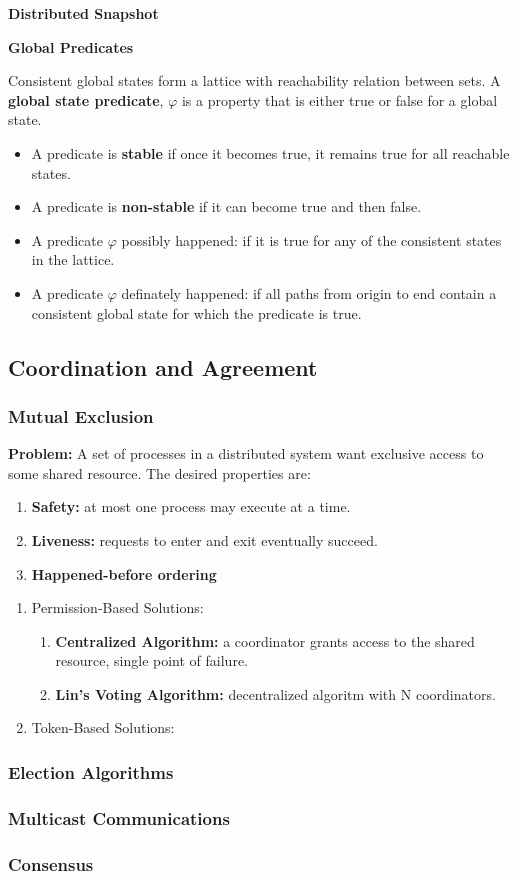 \textbf{Distributed Snapshot}

\textbf{Global Predicates}

Consistent global states form a lattice with reachability relation between sets.
A \textbf{global state predicate}, $\varphi$ is a property that is either true or false for a global state.
\begin{itemize}
    \item A predicate is \textbf{stable} if once it becomes true, it remains true for all reachable states.
    \item A predicate is \textbf{non-stable} if it can become true and then false.
    \item A predicate $\varphi$ possibly happened: if it is true for any of the consistent states in the lattice.
    \item A predicate $\varphi$ definately happened: if all paths from origin to end contain a consistent global state for which the predicate is true.
\end{itemize}

\subsection{Coordination and Agreement}

\subsubsection*{Mutual Exclusion}

\textbf{Problem:} A set of processes in a distributed system want exclusive access to some shared resource.
The desired properties are:
\begin{enumerate}
    \item \textbf{Safety:} at most one process may execute at a time.
    \item \textbf{Liveness:} requests to enter and exit eventually succeed.
    \item \textbf{Happened-before ordering}
\end{enumerate}

\begin{enumerate}
    \item Permission-Based Solutions:
    \begin{enumerate}
        \item \textbf{Centralized Algorithm:} a coordinator grants access to the shared resource, single point of failure.
        \item \textbf{Lin's Voting Algorithm:} decentralized algoritm with N coordinators.
    \end{enumerate}
    \item Token-Based Solutions:
    \begin{enumerate}
    \end{enumerate}
\end{enumerate}
\subsubsection*{Election Algorithms}

\subsubsection*{Multicast Communications}

\subsubsection*{Consensus}
